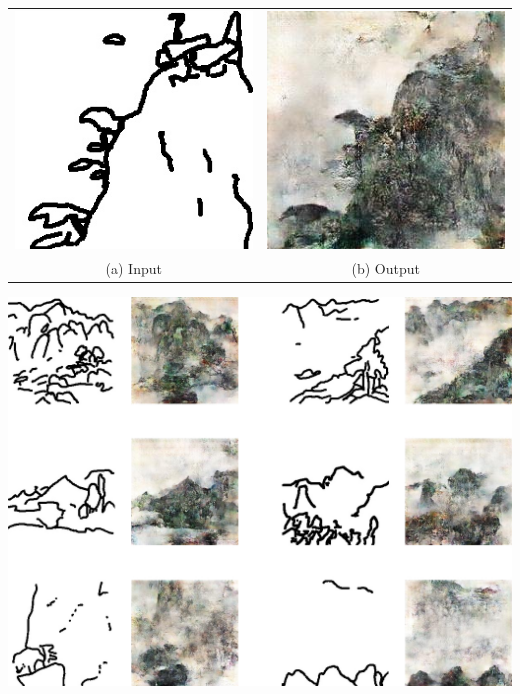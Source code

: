 \documentclass[a4paper, 12pt]{report}
\begin{document}
\begin{center}
  \centering
  \begin{tabular}{cc}
    \includegraphics[height=0.2\textheight]{images/abs-input.jpg}&
    \includegraphics[height=0.2\textheight]{images/abs-output.jpg}\\
    (a) Input &(b) Output
  \end{tabular}
\end{center}

\vspace*{\baselineskip}

\begin{center}
  \centering
    \includegraphics[width=0.9\linewidth]{images/abs-pc.jpg}
\end{center}
\end{document}
